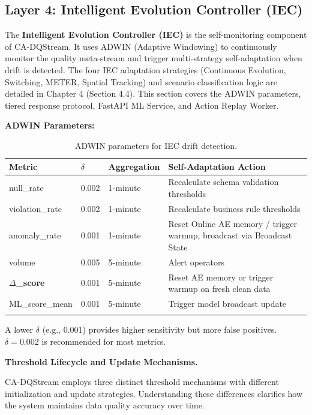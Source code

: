 \subsection{Layer 4: Intelligent Evolution Controller (IEC)}

The \textbf{Intelligent Evolution Controller (IEC)} is the self-monitoring component of CA-DQStream. It uses ADWIN (Adaptive Windowing) to continuously monitor the quality meta-stream and trigger multi-strategy self-adaptation when drift is detected. The four IEC adaptation strategies (Continuous Evolution, Switching, METER, Spatial Tracking) and scenario classification logic are detailed in Chapter 4 (Section 4.4). This section covers the ADWIN parameters, tiered response protocol, FastAPI ML Service, and Action Replay Worker.

\textbf{ADWIN Parameters:}

\begin{longtable}{|m{2.5cm}|M{2cm}|m{2.5cm}|m{5.5cm}|}
\hline
\textbf{Metric} & \textbf{$\delta$} & \textbf{Aggregation} & \textbf{Self-Adaptation Action} \\ \hline
null\_rate & 0.002 & 1-minute & Recalculate schema validation thresholds \\ \hline
violation\_rate & 0.002 & 1-minute & Recalculate business rule thresholds \\ \hline
anomaly\_rate & 0.001 & 1-minute & Reset Online AE memory / trigger warmup, broadcast via Broadcast State \\ \hline
volume & 0.005 & 5-minute & Alert operators \\ \hline
\textbf{$\Delta$\_score} & 0.001 & 5-minute & Reset AE memory or trigger warmup on fresh clean data \\ \hline
ML\_score\_mean & 0.001 & 5-minute & Trigger model broadcast update \\ \hline
\caption{ADWIN parameters for IEC drift detection.}
\label{tab:adwin_params}
\end{longtable}

A lower $\delta$ (e.g., 0.001) provides higher sensitivity but more false positives. $\delta=0.002$ is recommended for most metrics.

\bigskip
\noindent\textbf{Threshold Lifecycle and Update Mechanisms.}

CA-DQStream employs three distinct threshold mechanisms with different initialization and update strategies. Understanding these differences clarifies how the system maintains data quality accuracy over time.

